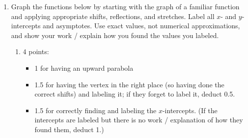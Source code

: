 \documentclass{article}
\begin{document}
\begin{enumerate}
\begin{enumerate}
    \begin{grading}
      2 points: 1 for having endpoints in the right places, 1 for having the right $x$-intercept. If neither of these are correct, but it looks like they tried to do a vertical stretch, give 0.5 points. 
    \end{grading}

    \begin{problem}
      $k(x) = 2 f(x)$
    \end{problem}


  \end{enumerate}

  \pspace{\newpage}

\item  

  Graph the functions below by starting with the graph of a familiar function and applying appropriate shifts, reflections, and stretches. Label all $x$- and $y$-intercepts and asymptotes. Use exact values, not numerical approximations, and show your work / explain how you found the values you labeled.

  \begin{enumerate}

  \item \label{graph-shifted-parabola}

    \begin{grading}
      4 points:
      \begin{itemize}[nosep]
      \item 1 for having an upward parabola
      \item 1.5 for having the vertex in the right place (so having done the correct shifts) and labeling it; if they forget to label it, deduct 0.5.
      \item 1.5 for correctly finding and labeling the $x$-intercepts. (If the intercepts are labeled but there is no work / explanation of how they found them, deduct 1.)
      \end{itemize}


\end{grading}
\end{enumerate}
\end{enumerate}
\end{document}
